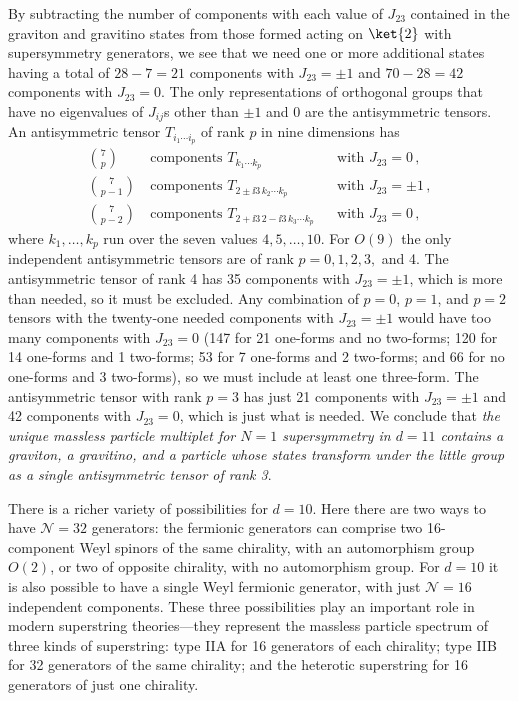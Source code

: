 By subtracting the number of components with each value of \(J_{23}\)
contained in the graviton and gravitino states from those formed acting
on \(\ket{2}\) with supersymmetry generators, we see that we need
one or more additional states having a total of \(28-7=21\) components
with \(J_{23}=\pm1\) and \(70-28=42\) components with \(J_{23}=0\).
The only representations of orthogonal groups that have no eigenvalues
of \(J_{ij}\)s other than \(\pm1\) and 0 are the antisymmetric tensors. An
antisymmetric tensor \(T_{i_1\cdots i_p}\) of rank \(p\) in nine
dimensions has
\[
  \begin{aligned}
    \binom{7}{p}
      &\ \text{components }T_{k_1\cdots k_p}
      &&\text{with }J_{23}=0\,,\\
    \binom{7}{p-1}
      &\ \text{components }T_{2\pm \ii3\,k_2\cdots k_p}
      &&\text{with }J_{23}=\pm1\,,\\
    \binom{7}{p-2}
      &\ \text{components }T_{2+\ii3\,2-\ii3\,k_3\cdots k_p}
      &&\text{with }J_{23}=0\,,
  \end{aligned}
\]
where \(k_1,\ldots,k_p\) run over the seven values \(4,5,\ldots,10\).
For \(O(9)\) the only independent antisymmetric tensors are of rank
\(p=0,1,2,3,\) and 4. The antisymmetric tensor of rank 4 has 35
components with \(J_{23}=\pm1\), which is more than needed, so it must be
excluded. Any combination of \(p=0\), \(p=1\), and \(p=2\) tensors with
the twenty-one needed components with \(J_{23}=\pm1\) would have too many
components with \(J_{23}=0\) (147 for 21 one-forms and no two-forms; 120
for 14 one-forms and 1 two-forms; 53 for 7 one-forms and 2 two-forms; and
66 for no one-forms and 3 two-forms), so we must include at least one
three-form. The antisymmetric tensor with rank \(p=3\) has just 21
components with \(J_{23}=\pm1\) and 42 components with \(J_{23}=0\),
which is just what is needed. We conclude that \emph{the unique massless
particle multiplet for \(N=1\) supersymmetry in \(d=11\) contains a
graviton, a gravitino, and a particle whose states transform under the
little group as a single antisymmetric tensor of rank 3}.

There is a richer variety of possibilities for \(d=10\). Here there are
two ways to have \(\mathcal N=32\) generators: the fermionic generators
can comprise two 16-component Weyl spinors of the same chirality, with an
automorphism group \(O(2)\), or two of opposite chirality, with no
automorphism group. For \(d=10\) it is also possible to have a single
Weyl fermionic generator, with just \(\mathcal N=16\) independent
components. These three possibilities play an important role in modern
superstring theories---they represent the massless particle spectrum of
three kinds of superstring: type IIA for 16 generators of each chirality;
type IIB for 32 generators of the same chirality; and the heterotic
superstring for 16 generators of just one chirality.


